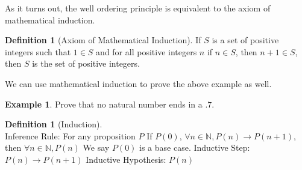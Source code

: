 \documentclass[letterpaper,10pt]{article}
\theoremstyle{plain}
\theoremstyle{definition}
\newtheorem{defn}[thm]{Definition}
\newtheorem{exmp}[thm]{Example}
\theoremstyle{remark}
\begin{document}
As it turns out, the well ordering principle is equivalent to the axiom of mathematical induction.

\begin{defn}[Axiom of Mathematical Induction]
If $S$ is a set of positive integers such that $1 \in S$ and
for all positive integers $n$ if $n \in S$, then $n + 1 \in S$, then $S$ is the set of positive integers.
\end{defn}
We can use mathematical induction to prove the above example as well.
\begin{exmp} Prove that no natural number ends in a $.7$.
\vspace{3cm}
\end{exmp}

\newpage

\begin{defn}[Induction] $ $\\
Inference Rule:
\newline
For any proposition $P$
\newline
If $P(0)$, $\forall n \in \mathbb{N},P(n) \to P(n+1)$, then $\forall n \in \mathbb{N}, P(n)$
\newline
We say $P(0)$ is a base case.
\newline
Inductive Step: $P(n) \to P(n+1)$
\newline
Inductive Hypothesis: $P(n)$
\end{defn}
\end{document}
